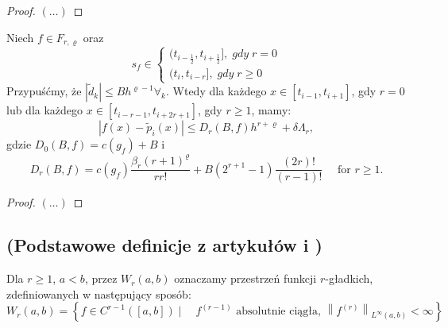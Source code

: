 \documentclass[oik, pdftex, robocza, man]{mgrwms}
\begin{document}
\begin{proof}
    $(\dots)$
\end{proof}

\begin{lemma}
    Niech $f \in F_{r, \varrho}$ oraz 
    \begin{equation*}
        s_{f} \in 
        \left\{
            \begin{array}{ll}
                (t_{i-\frac{1}{2}}, t_{i + \frac{1}{2}}], \; gdy \; r=0 \\
                (t_{i}, t_{i - r}], \; gdy \; r \geq 0    
            \end{array}
        \right.
    \end{equation*}
    Przypuśćmy, że $|\tilde{d}_{k}| \leq Bh^{\varrho-1} \forall_{k}$. Wtedy dla każdego $x \in [t_{i-1}, t_{i+1}]$, gdy $r=0$ lub dla każdego $x \in [t_{i-r-1}, t_{i+2r+1}]$, gdy $r \geq 1$, mamy:
    \begin{equation*}
        |f(x) - \tilde{p}_{i}(x)| \leq D_{r}(B, f)h^{r+\varrho} + \delta\Lambda_{r},
    \end{equation*}
    gdzie $D_{0}(B,f) = c(g_{f}) + B$ i
    \begin{equation*}
        D_{r}(B, f)=c\left(g_{f}\right) \frac{\beta_{r}(r+1)^{\varrho}}{r r !}+B\left(2^{r+1}-1\right) \frac{(2 r) !}{(r-1) !} \quad \text { for } r \geq 1 .
    \end{equation*}
\end{lemma}
\begin{proof}
    $(\dots)$
\end{proof}

\subsection{(Podstawowe definicje z artykułów \cite{PoA} i \cite{UA})}

Dla $r \geq 1$, $a < b$, przez $W_{r}(a,b)$ oznaczamy przestrzeń funkcji $r$-gładkich, zdefiniowanych w następujący sposób:
\begin{equation*}
    W_{r}(a, b)=\left\{f \in C^{r-1}([a, b]) \mid \quad f^{(r-1)} \text{ absolutnie ciągła, }\left\|f^{(r)}\right\|_{L^{\infty}(a, b)}<\infty\right\}
\end{equation*}
\end{document}
